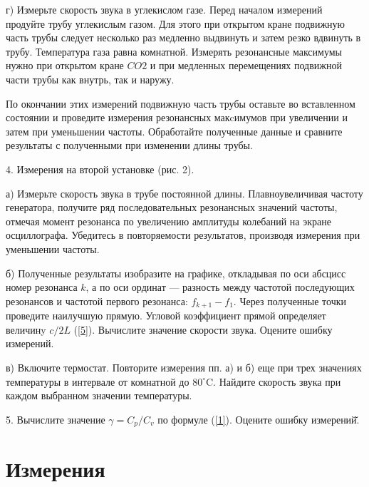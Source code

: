 \documentclass[12pt]{article}
\begin{document}
г) Измерьте скорость звука в углекислом газе. Перед началом измерений продуйте трубу углекислым газом. Для этого при открытом кране подвижную часть трубы следует несколько раз медленно выдвинуть и затем резко вдвинуть в трубу. Температура газа равна комнатной. Измерять резонансные максимумы нужно при открытом кране $CO2$ и при медленных перемещениях подвижной части трубы как внутрь, так и наружу.

По окончании этих измерений подвижную часть трубы оставьте во вставленном состоянии и проведите измерения резонансных макcимумов при увеличении и затем при уменьшении частоты. Обработайте полученные данные и сравните результаты с полученными при изменении длины трубы.

4. Измерения на второй установке (рис. 2).

а) Измерьте скорость звука в трубе постоянной длины. Плавноувеличивая частоту генератора, получите ряд последовательных резонансных значений частоты, отмечая момент резонанса по увеличению амплитуды колебаний на экране осциллографа. Убедитесь в повторяемости результатов, производя измерения при уменьшении частоты.

б) Полученные результаты изобразите на графике, откладывая по оси абсцисс номер резонанса $k$, а по оси ординат — разность между частотой последующих резонансов и частотой первого резонанса: $f_{k+1} - f_1$. Через полученные точки проведите наилучшую прямую. Угловой коэффициент прямой определяет величинy $c/2L$ (\ref{5}). Вычислите значение скорости звука. Оцените ошибку измерений.


в) Включите термостат. Повторите измерения пп. а) и б) еще при трех значениях температуры в интервале от комнатной до $80^\circ$C. Найдите скорость звука при каждом выбранном значении температуры.

5. Вычислите значение $\gamma = C_p/C_v$ по формуле (\ref{1}). Оцените ошибку измерений̆.

\newpage

\section*{Измерения}



\end{document}
